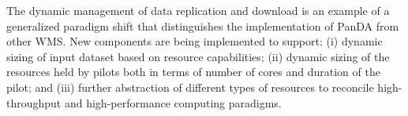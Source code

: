 The dynamic management of data replication and download is an example of a
generalized paradigm shift that distinguishes the implementation of PanDA from
other WMS. New components are being implemented to support: (i) dynamic sizing
of input dataset based on resource capabilities; (ii) dynamic sizing of the
resources held by pilots both in terms of number of cores and duration of the
pilot; and (iii) further abstraction of different types of resources to
reconcile high-throughput and high-performance computing paradigms.

%




